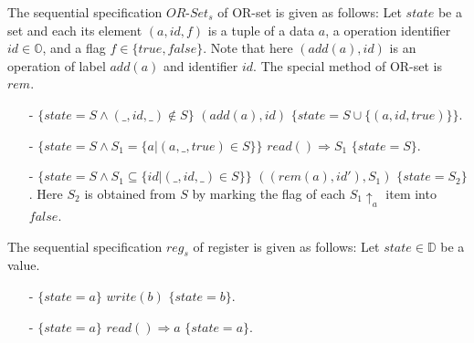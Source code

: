 {\begin{example}[OR-Set]
\label{definition:sequential specification of or-set}
The sequential specification $\mathit{OR}$-$\mathit{Set}_s$ of OR-set is given as follows: Let $\mathit{state}$ be a set and each its element $(a,\mathit{id},f)$ is a tuple of a data $a$, a operation identifier $\mathit{id} \in \mathbb{O}$, and a flag $f \in \{ \mathit{true},\mathit{false} \}$. Note that here $(add(a),\mathit{id})$ is an operation of label $add(a)$ and identifier $\mathit{id}$. The special method of OR-set is $\mathit{rem}$.
\begin{itemize}
\setlength{\itemsep}{0.5pt}
\item[-] $\{ \mathit{state} = S  \wedge (\_,\mathit{id},\_) \notin S \}$ $(\mathit{add}(a),\mathit{id})$ $\{ \mathit{state} = S \cup \{ (a,\mathit{id},\mathit{true}) \} \}$.
\item[-] $\{ \mathit{state} = S \wedge S_1 = \{ a \vert (a,\_,\mathit{true}) \in S \} \}$ $\mathit{read}() \Rightarrow S_1$ $\{ \mathit{state} = S \}$.
\item[-] $\{ \mathit{state} = S  \wedge S_1 \subseteq \{\mathit{id} \vert (\_,\mathit{id},\_) \in S\} \}$ $((rem(a),\mathit{id}'),S_1)$ $\{ \mathit{state} = S_2  \}$. Here $S_2$ is obtained from $S$ by marking the flag of each $S_1 \uparrow_{a}$ item into $\mathit{false}$.
\end{itemize}
\end{example}


\begin{example}[Register]
\label{definition:sequential specification of register}
The sequential specification $\mathit{reg}_s$ of register is given as follows: Let $\mathit{state} \in \mathbb{D}$ be a value.
\begin{itemize}
\setlength{\itemsep}{0.5pt}
\item[-] $\{ \mathit{state} = a  \}$ $\mathit{write}(b)$ $\{ \mathit{state} = b \}$.
\item[-] $\{ \mathit{state} = a \}$ $\mathit{read}() \Rightarrow a$ $\{ \mathit{state} = a \}$.
\end{itemize}
\end{example}


}
